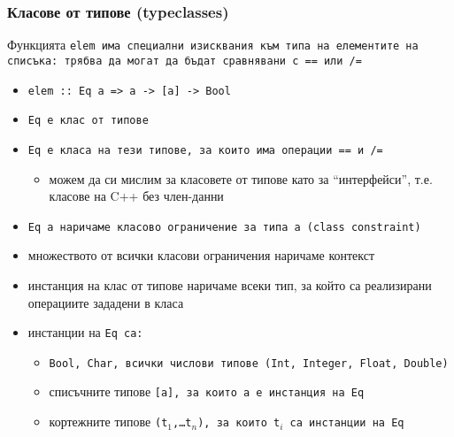 \documentclass{beamer}
\begin{document}
\begin{frame}
  \frametitle{Класове от типове (typeclasses)}
  Функцията \tt{elem} има специални изисквания към типа на елементите на списъка: трябва да могат да бъдат сравнявани с \tt{==} или \tt{/=}
  \begin{itemize}[<+->]
  \item \tt{elem :: \alert{Eq a => }a -> [a] -> Bool}
  \item \tt{Eq} е \alert{клас от типове}
  \item \tt{Eq} е класа на тези типове, за които има операции \tt{==} и \tt{/=}
    \begin{itemize}
    \item можем да си мислим за класовете от типове като за ``интерфейси'', т.е. класове на C++ без член-данни
    \end{itemize}
  \item \tt{Eq a} наричаме \alert{класово ограничение} за типа \tt a (class constraint)
  \item множеството от всички класови ограничения наричаме \alert{контекст}
  \item \alert{инстанция} на клас от типове наричаме всеки тип, за който са реализирани операциите зададени в класа
  \item инстанции на \tt{Eq} са:
    \begin{itemize}
    \item \tt{Bool}, \tt{Char}, всички числови типове (\tt{Int}, \tt{Integer}, \tt{Float}, \tt{Double})
    \item списъчните типове \tt{[a]}, за които \tt a е инстанция на \tt{Eq}
    \item кортежните типове \tt{(t$_1$,\ldots t$_n$)}, за които \tt{t$_i$} са инстанции на \tt{Eq}
    \end{itemize}
  \end{itemize}
\end{frame}
\end{document}
